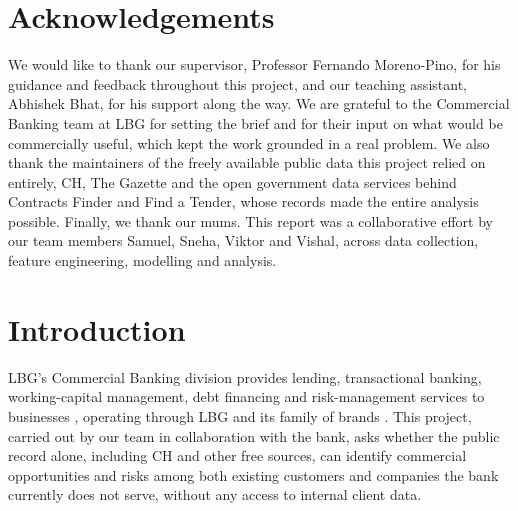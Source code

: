 \documentclass[    author={Samuel Menon Demelo; Sneha Saphala Ram Prasad; 
Viktor Ander Lindholm; Vishal Khatri},
               supervisor={Prof. Fernando Moreno-Pino},
                   degree={MSc},
                    title={Lloyds Commercial Banking Intelligence},
                 subtitle={Ranking SME Lending, Risk and Growth Prospects for Lloyds Banking Group},
                     type={},
                     year={2026}]{dissertation}
\newcommand{\note}[1]{}
\begin{document}
\chapter*{Acknowledgements}
\note{Supervisor, the Lloyds contacts who gave us the brief, and the maintainers
of the public data we relied on entirely. One paragraph is enough.}

We would like to thank our supervisor, Professor Fernando Moreno-Pino, for his guidance and feedback throughout this project, and our teaching assistant, Abhishek Bhat, for his support along the way. We are grateful to the Commercial Banking team at LBG for setting the brief and for their input on what would be commercially useful, which kept the work grounded in a real problem. We also thank the maintainers of the freely available public data this project relied on entirely, CH, The Gazette and the open government data services behind Contracts Finder and Find a Tender, whose records made the entire analysis possible. Finally, we thank our mums. This report was a collaborative effort by our team members Samuel, Sneha, Viktor and Vishal, across data collection, feature engineering, modelling and analysis.
\mainmatter

\chapter{Introduction}
\label{chap:introduction}

LBG's Commercial Banking division provides lending, transactional banking, working-capital management, debt financing and risk-management services to businesses \cite{lloyds_products}, operating through LBG and its family of brands \cite{lbg_brands}. This project, carried out by our team in collaboration with the bank, asks whether the public record alone, including CH and other free sources, can identify commercial opportunities and risks among both existing customers and companies the bank currently does not serve, without any access to internal client data.
\end{document}

